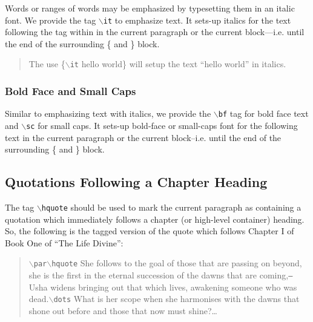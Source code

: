 \documentclass[11pt]{article}
\newcommand{\cmd}[1]{{\tt $\backslash$#1}}
\begin{document}
Words or ranges of words may be emphasized by typesetting them in an
italic font. We provide the tag \cmd{it} to emphasize text. It sets-up
italics for the text following the tag within in the current paragraph
or the current block---i.e. until the end of the surrounding \{ and \}
block.

\begin{quote}
  The use \{\cmd{it} hello world\} will setup the text ``hello world''
  in italics.
\end{quote}





\subsubsection{\textbf{Bold Face} and {\sc Small Caps}}

Similar to emphasizing text with italics, we provide the \cmd{bf} tag
for bold face text and \cmd{sc} for small caps.  It sets-up bold-face
or small-caps font for the following text in the current paragraph or
the current block--i.e. until the end of the surrounding \{ and \}
block.


\subsection{Quotations Following a Chapter Heading}

The tag \cmd{hquote} should be used to mark the current paragraph as
containing a quotation which immediately follows a chapter (or
high-level container) heading. So, the following is the tagged version
of the quote which follows Chapter I of Book One of ``The Life Divine'':

\begin{quote}
  \cmd{par}\cmd{hquote} She follows to the goal of those that are
  passing on beyond, she is the first in the eternal succession of the
  dawns that are coming,{\tt ---}Usha widens bringing out that which lives,
  awakening someone who was dead.\cmd{dots} What is her scope when she
  harmonises with the dawns that shone out before and those that now
  must shine?\ldots
\end{quote}


\end{document}
